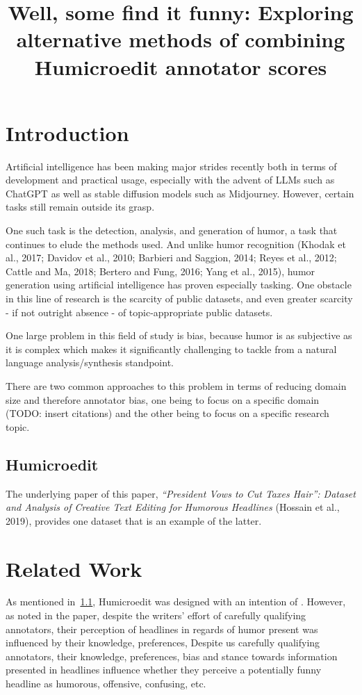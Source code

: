\documentclass[10pt, a4paper]{article}
\title{Well, some find it funny: Exploring alternative methods of combining Humicroedit annotator scores}
\begin{document}
\maketitleabstract

\section{Introduction}

Artificial intelligence has been making major strides recently both in terms of development and practical usage, especially with the advent of LLMs such as ChatGPT as well as stable diffusion models such as Midjourney. However, certain tasks still remain outside its grasp. 

One such task is the detection, analysis, and generation of humor, a task that continues to elude the methods used. And unlike humor recognition (Khodak et al., 2017; Davidov et al., 2010; Barbieri and Saggion, 2014; Reyes et al., 2012; Cattle and Ma, 2018; Bertero and Fung, 2016; Yang et al., 2015), humor generation using artificial intelligence has proven especially tasking. One obstacle in this line of research is the scarcity of public datasets, and even greater scarcity - if not outright absence - of topic-appropriate public datasets.

One large problem in this field of study is bias, because humor is as subjective as it is complex which makes it significantly challenging to tackle from a natural language analysis/synthesis standpoint.

There are two common approaches to this problem in terms of reducing domain size and therefore annotator bias, one being to focus on a specific domain (TODO: insert citations) and the other being to focus on a specific research topic.

\subsection{Humicroedit}
\label{sec:HME}

The underlying paper of this paper, \textit{“President Vows to Cut Taxes Hair”:
Dataset and Analysis of Creative Text Editing for Humorous Headlines} (Hossain et al., 2019), provides one dataset that is an example of the latter. 

\section{Related Work}

As mentioned in~\ref{sec:HME}, Humicroedit was designed with an intention of . However, as noted in the paper, despite the writers' effort of carefully qualifying annotators, their perception of headlines in regards of humor present was influenced by their knowledge, preferences, 
Despite us carefully qualifying annotators, their
knowledge, preferences, bias and stance towards information presented in headlines influence whether they perceive a potentially funny
headline as humorous, offensive, confusing, etc.
\end{document}
